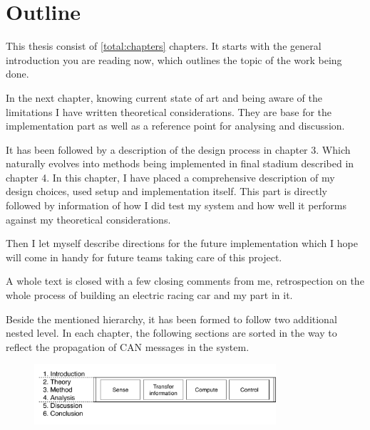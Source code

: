 

\section{Outline}
This thesis consist of \ref{total:chapters} chapters. It starts with the general introduction you are reading now, which outlines the topic of the work being done.

In the next chapter, knowing current state of art and being aware of the limitations I have written theoretical considerations. They are base for the implementation part as well as a reference point for analysing and discussion.

It has been followed by a description of the design process in chapter 3. Which naturally evolves into methods being implemented in final stadium described in chapter 4. In this chapter, I have placed a comprehensive description of my design choices, used setup and implementation itself. This part is directly followed by information of how I did test my system and how well it performs against my theoretical considerations.

Then I let myself describe directions for the future implementation which I hope will come in handy for future teams taking care of this project.

A whole text is closed with a few closing comments from me, retrospection on the whole process of building an electric racing car and my part in it.

Beside the mentioned hierarchy, it has been formed to follow two additional nested level. In each chapter, the following sections are sorted in the way to reflect the propagation of CAN messages in the system.

\begin{figure}[h]
    \centering
            \includegraphics[width=0.8\textwidth]{figures/Outline}
            \label{outline}
\end{figure}
